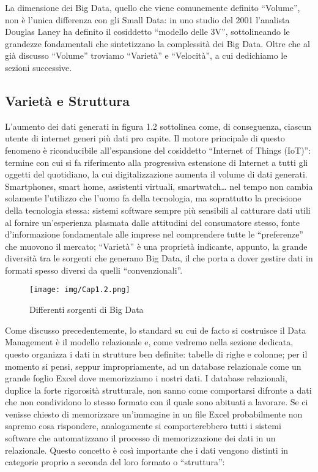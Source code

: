 \documentclass[a4paper,12pt]{report}
\begin{document}
La dimensione dei Big Data, quello che viene comunemente definito “Volume”, non è l’unica differenza con gli Small Data: in uno studio del 2001 l’analista Douglas Laney ha definito il cosiddetto “modello delle 3V”, sottolineando le grandezze fondamentali che sintetizzano la complessità dei Big Data. Oltre che al già discusso “Volume” troviamo “Varietà” e “Velocità”, a cui dedichiamo le sezioni successive.
\subsection{Varietà e Struttura}
L’aumento dei dati generati in figura 1.2 sottolinea come, di conseguenza, ciascun utente di internet generi più dati pro capite. Il motore principale di questo fenomeno è riconducibile all’espansione del cosiddetto “Internet of Things (IoT)”: termine con cui si fa riferimento alla progressiva estensione di Internet a tutti gli oggetti del quotidiano, la cui digitalizzazione aumenta il volume di dati generati. Smartphones, smart home, assistenti virtuali, smartwatch… nel tempo non cambia solamente l’utilizzo che l’uomo fa della tecnologia, ma soprattutto la precisione della tecnologia stessa: sistemi software sempre più sensibili al catturare dati utili al fornire un’esperienza plasmata dalle attitudini del consumatore stesso, fonte d’informazione fondamentale alle imprese nel comprendere tutte le “preferenze” che muovono il mercato; “Varietà” è una proprietà indicante, appunto, la grande diversità tra le sorgenti che generano Big Data, il che porta a dover gestire dati in formati spesso diversi da quelli “convenzionali”.
\begin{figure}[h]
    \centering
    \texttt{[image: img/Cap1.2.png]}
    \caption{Differenti sorgenti di Big Data}
\end{figure}
\newpage
\noindent
Come discusso precedentemente, lo standard su cui de facto si costruisce il Data Management è il modello relazionale e, come vedremo nella sezione dedicata, questo organizza i dati in strutture ben definite: tabelle di righe e colonne; per il momento si pensi, seppur impropriamente, ad un database relazionale come un grande foglio Excel dove memorizziamo i nostri dati. I database relazionali, duplice la forte rigorosità strutturale, non sanno come comportarsi difronte a dati che non condividono lo stesso formato con il quale sono abituati a lavorare. Se ci venisse chiesto di memorizzare un’immagine in un file Excel probabilmente non sapremo cosa rispondere, analogamente si comporterebbero tutti i sistemi software che automatizzano il processo di memorizzazione dei dati in un relazionale. Questo concetto è così importante che i dati vengono distinti in categorie proprio a seconda del loro formato o “struttura”:
\end{document}
